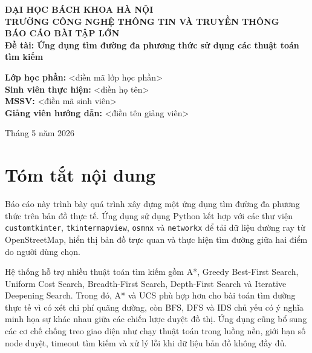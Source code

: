 \documentclass[12pt,a4paper]{article}
\begin{document}
\begin{titlepage}
    \centering
    {\Large \textbf{ĐẠI HỌC BÁCH KHOA HÀ NỘI}}\\[0.3cm]
    {\Large \textbf{TRƯỜNG CÔNG NGHỆ THÔNG TIN VÀ TRUYỀN THÔNG}}\\[2cm]

    {\Large \textbf{BÁO CÁO BÀI TẬP LỚN}}\\[0.5cm]
    {\Large \textbf{Đề tài: Ứng dụng tìm đường đa phương thức sử dụng các thuật toán tìm kiếm}}\\[1.5cm]

    \begin{flushleft}
    \hspace{2cm}\textbf{Lớp học phần:} \textless điền mã lớp học phần\textgreater\\[0.4cm]
    \hspace{2cm}\textbf{Sinh viên thực hiện:} \textless điền họ tên\textgreater\\[0.4cm]
    \hspace{2cm}\textbf{MSSV:} \textless điền mã sinh viên\textgreater\\[0.4cm]
    \hspace{2cm}\textbf{Giảng viên hướng dẫn:} \textless điền tên giảng viên\textgreater
    \end{flushleft}

    \vfill
    {\large Tháng 5 năm 2026}
\end{titlepage}


\section*{Tóm tắt nội dung}

Báo cáo này trình bày quá trình xây dựng một ứng dụng tìm đường đa phương thức trên bản đồ thực tế. Ứng dụng sử dụng Python kết hợp với các thư viện \texttt{customtkinter}, \texttt{tkintermapview}, \texttt{osmnx} và \texttt{networkx} để tải dữ liệu đường ray từ OpenStreetMap, hiển thị bản đồ trực quan và thực hiện tìm đường giữa hai điểm do người dùng chọn.

Hệ thống hỗ trợ nhiều thuật toán tìm kiếm gồm A*, Greedy Best-First Search, Uniform Cost Search, Breadth-First Search, Depth-First Search và Iterative Deepening Search. Trong đó, A* và UCS phù hợp hơn cho bài toán tìm đường thực tế vì có xét chi phí quãng đường, còn BFS, DFS và IDS chủ yếu có ý nghĩa minh họa sự khác nhau giữa các chiến lược duyệt đồ thị. Ứng dụng cũng bổ sung các cơ chế chống treo giao diện như chạy thuật toán trong luồng nền, giới hạn số node duyệt, timeout tìm kiếm và xử lý lỗi khi dữ liệu bản đồ không đầy đủ.
\end{document}
